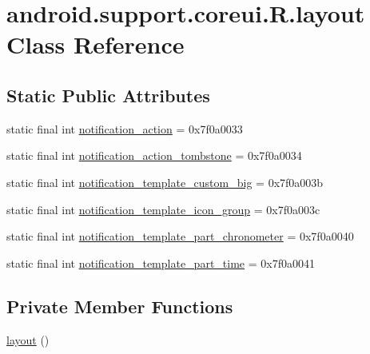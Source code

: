 \hypertarget{classandroid_1_1support_1_1coreui_1_1_r_1_1layout}{}\section{android.\+support.\+coreui.\+R.\+layout Class Reference}
\label{classandroid_1_1support_1_1coreui_1_1_r_1_1layout}
\subsection*{Static Public Attributes}
\begin{DoxyCompactItemize}
\item 
static final int \mbox{\hyperlink{classandroid_1_1support_1_1coreui_1_1_r_1_1layout_a1dda41cfcdb2fd191b6eec11290949a6}{notification\+\_\+action}} = 0x7f0a0033
\item 
static final int \mbox{\hyperlink{classandroid_1_1support_1_1coreui_1_1_r_1_1layout_af6e1c6ee8d56914a4fb8eeb45a34974d}{notification\+\_\+action\+\_\+tombstone}} = 0x7f0a0034
\item 
static final int \mbox{\hyperlink{classandroid_1_1support_1_1coreui_1_1_r_1_1layout_a77a5624486e61ded730f4089ff13ff0f}{notification\+\_\+template\+\_\+custom\+\_\+big}} = 0x7f0a003b
\item 
static final int \mbox{\hyperlink{classandroid_1_1support_1_1coreui_1_1_r_1_1layout_aae7fb0b25261997aa462aa8c530778c9}{notification\+\_\+template\+\_\+icon\+\_\+group}} = 0x7f0a003c
\item 
static final int \mbox{\hyperlink{classandroid_1_1support_1_1coreui_1_1_r_1_1layout_a97537d127c2746ea629497a3ad4cab14}{notification\+\_\+template\+\_\+part\+\_\+chronometer}} = 0x7f0a0040
\item 
static final int \mbox{\hyperlink{classandroid_1_1support_1_1coreui_1_1_r_1_1layout_a102d25ab2960dcd40dcace441e1fe808}{notification\+\_\+template\+\_\+part\+\_\+time}} = 0x7f0a0041
\end{DoxyCompactItemize}
\subsection*{Private Member Functions}
\begin{DoxyCompactItemize}
\item 
\mbox{\hyperlink{classandroid_1_1support_1_1coreui_1_1_r_1_1layout_a7a07308925510865b0b94d4a48aa7ce3}{layout}} ()
\end{DoxyCompactItemize}



